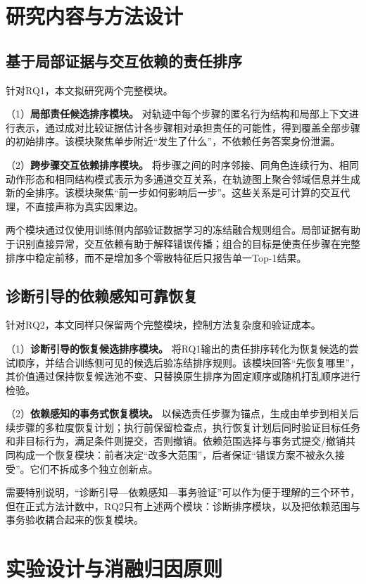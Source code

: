 \section{研究内容与方法设计}

\subsection{基于局部证据与交互依赖的责任排序}

针对RQ1，本文拟研究两个完整模块。

（1）\textbf{局部责任候选排序模块。} 对轨迹中每个步骤的匿名行为结构和局部上下文进行表示，通过成对比较证据估计各步骤相对承担责任的可能性，得到覆盖全部步骤的初始排序。该模块聚焦单步附近“发生了什么”，不依赖任务答案身份泄漏。

（2）\textbf{跨步骤交互依赖排序模块。} 将步骤之间的时序邻接、同角色连续行为、相同动作形态和相同结构模式表示为多通道交互关系，在轨迹图上聚合邻域信息并生成新的全排序。该模块聚焦“前一步如何影响后一步”。这些关系是可计算的交互代理，不直接声称为真实因果边。

两个模块通过仅使用训练侧内部验证数据学习的冻结融合规则组合。局部证据有助于识别直接异常，交互依赖有助于解释错误传播；组合的目标是使责任步骤在完整排序中稳定前移，而不是增加多个零散特征后只报告单一Top-1结果。

\subsection{诊断引导的依赖感知可靠恢复}

针对RQ2，本文同样只保留两个完整模块，控制方法复杂度和验证成本。

（1）\textbf{诊断引导的恢复候选排序模块。} 将RQ1输出的责任排序转化为恢复候选的尝试顺序，并结合训练侧可见的候选后验冻结排序规则。该模块回答“先恢复哪里”，其价值通过保持恢复候选池不变、只替换原生排序为固定顺序或随机打乱顺序进行检验。

（2）\textbf{依赖感知的事务式恢复模块。} 以候选责任步骤为锚点，生成由单步到相关后续步骤的多粒度恢复计划；执行前保留检查点，执行恢复计划后同时验证目标任务和非目标行为，满足条件则提交，否则撤销。依赖范围选择与事务式提交/撤销共同构成一个恢复模块：前者决定“改多大范围”，后者保证“错误方案不被永久接受”。它们不拆成多个独立创新点。

需要特别说明，“诊断引导—依赖感知—事务验证”可以作为便于理解的三个环节，但在正式方法计数中，RQ2只有上述两个模块：诊断排序模块，以及把依赖范围与事务验收耦合起来的恢复模块。

\section{实验设计与消融归因原则}


